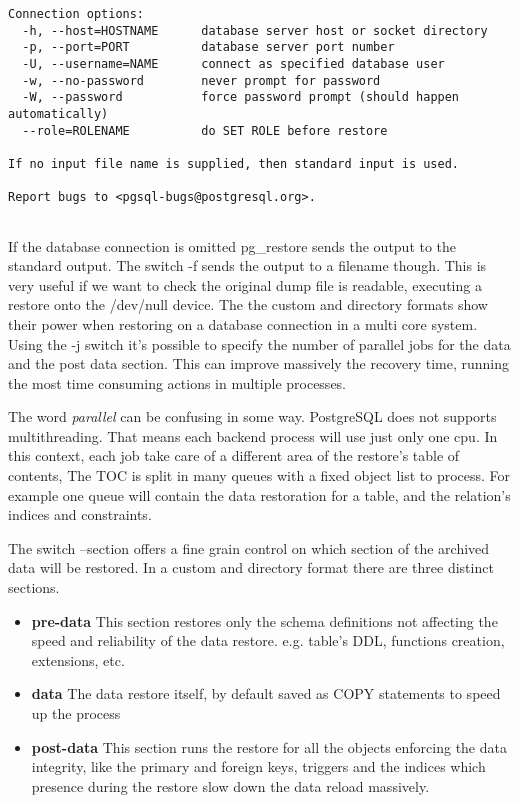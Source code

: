 \begin{verbatim}
Connection options:
  -h, --host=HOSTNAME      database server host or socket directory
  -p, --port=PORT          database server port number
  -U, --username=NAME      connect as specified database user
  -w, --no-password        never prompt for password
  -W, --password           force password prompt (should happen automatically)
  --role=ROLENAME          do SET ROLE before restore

If no input file name is supplied, then standard input is used.

Report bugs to <pgsql-bugs@postgresql.org>.
 
\end{verbatim}


If the database connection is omitted pg\_restore sends the output to the standard output. The 
switch -f sends the output to a filename though. This is very useful if we want to check the 
original dump file is readable, executing a restore onto the /dev/null device.\newline
The the custom and directory formats show their power when restoring on a database 
connection in a multi core system. Using the -j switch it's possible to specify the number of 
parallel jobs for the data and the post data section. This can improve massively the 
recovery time, running the most time consuming actions in multiple processes.\newline

The word \textit{parallel} can be confusing in some way. PostgreSQL does not supports 
multithreading. That means each backend process will use just only one cpu. In this context, each 
job take care of a different area of the restore's table of contents, The TOC is split in 
many queues with a fixed object list to process. For example one queue will contain the data 
restoration for a table, and the relation's indices and constraints.\newline

The switch --section offers a fine grain control on which section of the archived data will be 
restored. In a custom and directory format there are three distinct sections. 
\begin{itemize}
 \item \textbf{pre-data} This section restores only the schema definitions not affecting the speed 
and reliability of the data restore. e.g. table's DDL, functions creation, extensions, etc.
\item  \textbf{data} The data restore itself, by default saved as COPY statements to speed up the 
process
\item  \textbf{post-data} This section runs the restore for all the objects enforcing the data 
integrity, like the primary and foreign keys, triggers and the indices which presence during the 
restore slow down the data reload massively.
\end{itemize}

